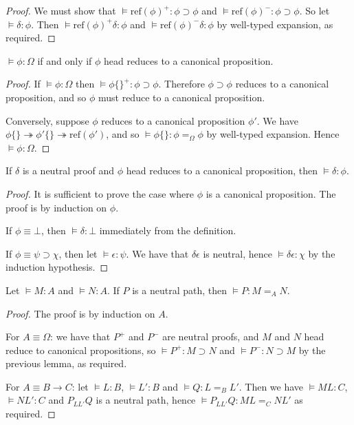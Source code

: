 \documentclass[a4paper,UKenglish]{lipics-v2016}
\newcommand*{\reff}[1]{\ensuremath{\mathrm{ref} \left( {#1} \right)}}
\theoremstyle{plain}
\begin{document}
\begin{proof}
We must show that $\models \reff{\phi}^+ : \phi \supset \phi$ and $\models \reff{\phi}^- : \phi \supset \phi$.  So let $\models \delta : \phi$.
Then $\models \reff{\phi}^+ \delta : \phi$ and $\models \reff{\phi}^- \delta : \phi$ by well-typed expansion, as required.
\end{proof}

\begin{lemma}
$\models \phi : \Omega$ if and only if $\phi$ head reduces to a canonical proposition.
\end{lemma}

\begin{proof}
If $\models \phi : \Omega$ then $\models \phi \{\}^+ : \phi \supset \phi$.  Therefore $\phi \supset \phi$ reduces to a canonical proposition,
and so $\phi$ must reduce to a canonical proposition.

Conversely, suppose $\phi$ reduces to a canonical proposition $\phi'$.  We have $\phi \{\} \twoheadrightarrow \phi' \{\} \twoheadrightarrow \reff{\phi'}$, and so $\models \phi \{\} : \phi =_\Omega \phi$ by well-typed expansion.  Hence $\models \phi : \Omega$.
\end{proof}

\begin{lemma}
\label{lm:neutral-proof}
If $\delta$ is a neutral proof and $\phi$ head reduces to a canonical proposition, then $\models \delta : \phi$.
\end{lemma}

\begin{proof}
It is sufficient to prove the case where $\phi$ is a canonical proposition.  The proof is by induction on $\phi$.

If $\phi \equiv \bot$, then $\models \delta : \bot$ immediately from the definition.

If $\phi \equiv \psi \supset \chi$, then let $\models \epsilon : \psi$.  We have that $\delta \epsilon$ is neutral,
hence $\models \delta \epsilon : \chi$ by the induction hypothesis.
\end{proof}

\begin{lemma}
\label{lm:neutral-path}
Let $\models M : A$ and $\models N : A$.  If $P$ is a neutral path, then $\models P : M =_A N$.
\end{lemma}

\begin{proof}
The proof is by induction on $A$.

For $A \equiv \Omega$: we have that $P^+$ and $P^-$ are neutral proofs, and $M$ and $N$ head reduce to canonical propositions, so $\models P^+ : M \supset N$ and
$\models P^- : N \supset M$ by the previous lemma, as required.

For $A \equiv B \rightarrow C$: let $\models L : B$, $\models L' : B$ and $\models Q : L =_B L'$.  Then we have $\models ML : C$, $\models NL' : C$ and
$P_{LL'} Q$ is a neutral path, hence $\models P_{L L'} Q : ML =_C NL'$ as required.
\end{proof}
\end{document}

